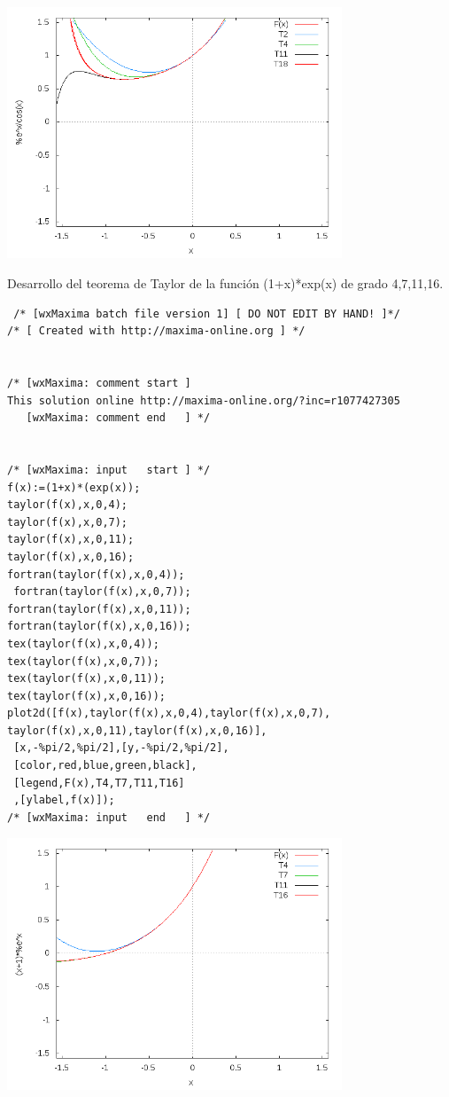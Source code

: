 \documentclass[12pt]{article}
\begin{document}
 
   \begin{center}
  
    \includegraphics[width=10cm]{expcos.png}
  \end{center}
 
 
 \hspace {0.5cm}


  Desarrollo del teorema de Taylor de la función (1+x)*exp(x) de grado 4,7,11,16.
\begin{verbatim}
 /* [wxMaxima batch file version 1] [ DO NOT EDIT BY HAND! ]*/
/* [ Created with http://maxima-online.org ] */


/* [wxMaxima: comment start ]
This solution online http://maxima-online.org/?inc=r1077427305
   [wxMaxima: comment end   ] */


/* [wxMaxima: input   start ] */
f(x):=(1+x)*(exp(x));
taylor(f(x),x,0,4);
taylor(f(x),x,0,7);
taylor(f(x),x,0,11);
taylor(f(x),x,0,16);
fortran(taylor(f(x),x,0,4));
 fortran(taylor(f(x),x,0,7));
fortran(taylor(f(x),x,0,11));
fortran(taylor(f(x),x,0,16));
tex(taylor(f(x),x,0,4));
tex(taylor(f(x),x,0,7));
tex(taylor(f(x),x,0,11));
tex(taylor(f(x),x,0,16));
plot2d([f(x),taylor(f(x),x,0,4),taylor(f(x),x,0,7),
taylor(f(x),x,0,11),taylor(f(x),x,0,16)],
 [x,-%pi/2,%pi/2],[y,-%pi/2,%pi/2],
 [color,red,blue,green,black],
 [legend,F(x),T4,T7,T11,T16]
 ,[ylabel,f(x)]);
/* [wxMaxima: input   end   ] */
 \end{verbatim}
 
 
   \begin{center}
  
    \includegraphics[width=10cm]{1xexp.png}
  \end{center}
 
 
 
 \hspace {0.5cm}

 
\end{document}
